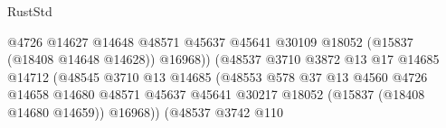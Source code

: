 \begin{lexlean}{RustStd}
\begin{coremodule}
                                                            @4726
                                                            @14627
                                                            @14648
                                                            @48571
                                                            @45637
                                                            @45641
                                                            @30109
                                                            @18052
                                                            (@15837 (@18408 @14648 @14628))
                                                            @16968))
                                                        (@48537
                                                          @3710
                                                          @3872
                                                          @13
                                                          @17
                                                          @14685
                                                          @14712
                                                          (@48545
                                                            @3710
                                                            @13
                                                            @14685
                                                            (@48553
                                                              @578
                                                              @37
                                                              @13
                                                              @4560
                                                              @4726
                                                              @14658
                                                              @14680
                                                              @48571
                                                              @45637
                                                              @45641
                                                              @30217
                                                              @18052
                                                              (@15837 (@18408 @14680 @14659))
                                                              @16968))
                                                          (@48537
                                                            @3742
                                                            @110

\end{coremodule}
\end{lexlean}
